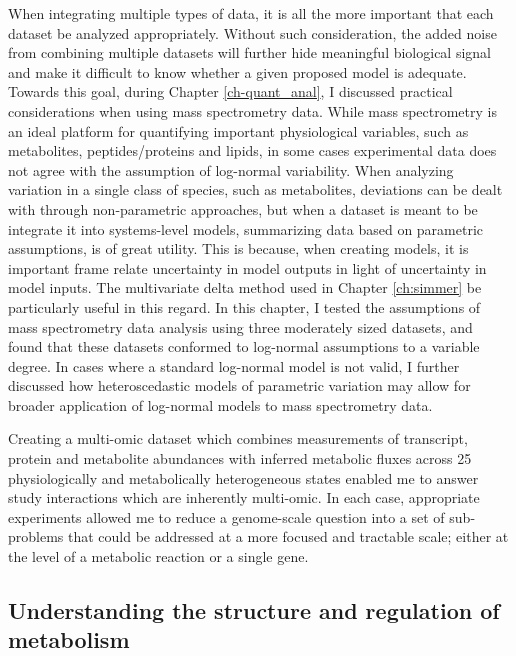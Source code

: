 When integrating multiple types of data, it is all the more important that each dataset be analyzed appropriately. Without such consideration, the added noise from combining multiple datasets will further hide meaningful biological signal and make it difficult to know whether a given proposed model is adequate. Towards this goal, during Chapter \ref{ch-quant_anal}, I discussed practical considerations when using mass spectrometry data.  While mass spectrometry is an ideal platform for quantifying important physiological variables, such as metabolites, peptides/proteins and lipids, in some cases experimental data does not agree with the assumption of log-normal variability. When analyzing variation in a single class of species, such as metabolites, deviations can be dealt with through non-parametric approaches, but when a dataset is meant to be integrate it into systems-level models, summarizing data based on parametric assumptions, is of great utility.  This is because, when creating models, it is important frame relate uncertainty in model outputs in light of uncertainty in model inputs. The multivariate delta method used in Chapter \ref{ch:simmer} be particularly useful in this regard. In this chapter, I tested the assumptions of mass spectrometry data analysis using three moderately sized datasets, and found that these datasets conformed to log-normal assumptions to a variable degree. In cases where a standard log-normal model is not valid, I further discussed how heteroscedastic models of parametric variation may allow for broader application of log-normal models to mass spectrometry data.

Creating a multi-omic dataset which combines measurements of transcript, protein and metabolite abundances with inferred metabolic fluxes across 25 physiologically and metabolically heterogeneous states enabled me to answer study interactions which are inherently multi-omic.  In each case, appropriate experiments allowed me to reduce a genome-scale question into a set of sub-problems that could be addressed at a more focused and tractable scale; either at the level of a metabolic reaction or a single gene.  

\subsection{Understanding the structure and regulation of metabolism}

